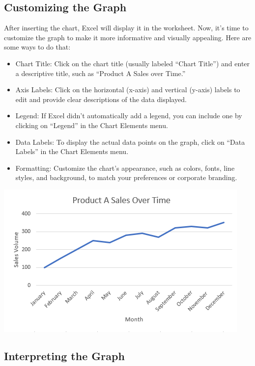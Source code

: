 \documentclass[
]{book}
\begin{document}
\hypertarget{customizing-the-graph}{%
\subsection{Customizing the Graph}\label{customizing-the-graph}}

After inserting the chart, Excel will display it in the worksheet. Now, it's time to customize the graph to make it more informative and visually appealing. Here are some ways to do that:

\begin{itemize}
\item
  Chart Title: Click on the chart title (usually labeled ``Chart Title'') and enter a descriptive title, such as ``Product A Sales over Time.''
\item
  Axis Labels: Click on the horizontal (x-axis) and vertical (y-axis) labels to edit and provide clear descriptions of the data displayed.
\item
  Legend: If Excel didn't automatically add a legend, you can include one by clicking on ``Legend'' in the Chart Elements menu.
\item
  Data Labels: To display the actual data points on the graph, click on ``Data Labels'' in the Chart Elements menu.
\item
  Formatting: Customize the chart's appearance, such as colors, fonts, line styles, and background, to match your preferences or corporate branding.
\end{itemize}

\includegraphics{GraphPic4.png}

\hypertarget{interpreting-the-graph}{%
\subsection{Interpreting the Graph}\label{interpreting-the-graph}}
\end{document}
